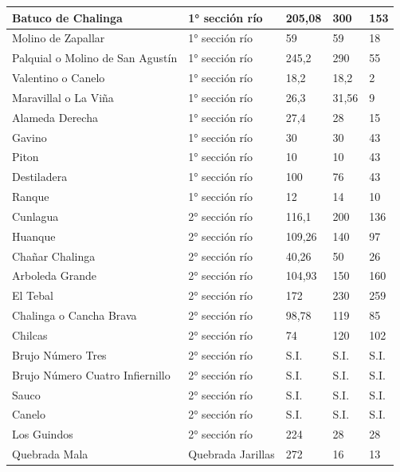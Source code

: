 \documentclass[]{article}
\begin{document}
\begin{longtable}{|p{4cm}|p{3cm}|p{2cm}|p{2.5cm}|p{2cm}|}
	Batuco de Chalinga 					& 1° sección río 	  	  	& 205,08 & 300 	 & 153	\\ \hline
	Molino de Zapallar 					& 1° sección río 	  	  	& 59 	 & 59 	 & 18 	\\ \hline
	Palquial o Molino de San Agustín	& 1° sección río 	  	  	& 245,2	 & 290 	 & 55 	\\ \hline
	Valentino o Canelo					& 1° sección río 	  	  	& 18,2 	 & 18,2	 & 2 	\\ \hline
	Maravillal o La Viña				& 1° sección río 	  	  	& 26,3	 & 31,56 & 9 	\\ \hline
	Alameda Derecha						& 1° sección río 	  	  	& 27,4	 & 28 	 & 15 	\\ \hline
	Gavino								& 1° sección río 	  	  	& 30	 & 30 	 & 43 	\\ \hline
	Piton								& 1° sección río 		  	& 10 	 & 10 	 & 43 	\\ \hline
	Destiladera							& 1° sección río 	  	  	& 100 	 & 76 	 & 43 	\\ \hline
	Ranque								& 1° sección río 	  	  	& 12 	 & 14 	 & 10 	\\ \hline
	Cunlagua							& 2° sección río 	  	  	& 116,1	 & 200 	 & 136 	\\ \hline
	Huanque								& 2° sección río 	  	  	& 109,26 & 140 	 & 97 	\\ \hline
	Chañar Chalinga						& 2° sección río 	  	  	& 40,26	 & 50	 & 26 	\\ \hline
	Arboleda Grande						& 2° sección río 	  	  	& 104,93 & 150 	 & 160 	\\ \hline
	El Tebal							& 2° sección río 	  	  	& 172 	 & 230	 & 259 	\\ \hline
	Chalinga o Cancha Brava				& 2° sección río 	 	  	& 98,78	 & 119	 & 85 	\\ \hline
	Chilcas								& 2° sección río 	  	  	& 74	 & 120 	 & 102 	\\ \hline
	Brujo Número Tres					& 2° sección río 	  	  	& S.I. 	 & S.I.	 & S.I.	\\ \hline
	Brujo Número Cuatro Infiernillo		& 2° sección río 	  	  	& S.I. 	 & S.I.	 & S.I.	\\ \hline
	Sauco								& 2° sección río 	  	  	& S.I. 	 & S.I.	 & S.I. \\ \hline
	Canelo								& 2° sección río 	  	  	& S.I. 	 & S.I.  & S.I.	\\ \hline
	Los Guindos							& 2° sección río 	 	  	& 224 	 & 28 	 & 28 	\\ \hline
	Quebrada Mala						& Quebrada Jarillas	 	  	& 272 	 & 16 	 & 13 	\\ \hline

\end{longtable}
\end{document}
